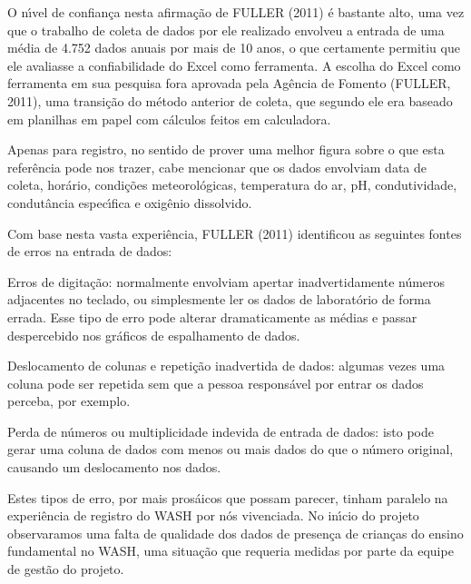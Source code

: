 \documentclass[
12pt,		%
openright,	%
twoside,  %
a4paper,			%
chapter=TITLE,		%
english,			%
french,				%
spanish,			%
brazil				%
]{USPSC-classe/USPSC}
\begin{document}
O n\'{\i}vel de confian\c{c}a nesta afirma\c{c}\~ao de  FULLER (2011) \'e bastante alto, uma vez que o trabalho de coleta de dados por ele realizado envolveu a entrada de uma m\'edia de 4.752 dados anuais por mais de 10 anos, o que certamente permitiu que ele avaliasse a confiabilidade do Excel como ferramenta. A escolha do Excel como ferramenta em sua pesquisa fora aprovada pela Ag\^encia de Fomento  (FULLER, 2011), uma transi\c{c}\~ao do m\'etodo anterior de coleta, que segundo ele era baseado em planilhas em papel com c\'alculos feitos em calculadora.










Apenas para registro, no sentido de prover uma melhor figura sobre o que esta refer\^encia pode nos trazer, cabe mencionar que os dados envolviam data de coleta, hor\'ario, condi\c{c}\~oes meteorol\'ogicas, temperatura do ar, pH, condutividade, condut\^ancia espec\'{\i}fica e oxig\^enio dissolvido.










Com base nesta vasta experi\^encia,  FULLER (2011) identificou as seguintes fontes de erros na entrada de dados:











\begin{alineas}
\item Erros de digita\c{c}\~ao: normalmente envolviam apertar inadvertidamente n\'umeros adjacentes no teclado, ou simplesmente ler os dados de laborat\'orio de forma errada. Esse tipo de erro pode alterar dramaticamente as m\'edias e passar despercebido nos gr\'aficos de espalhamento de dados.
\item Deslocamento de colunas e repeti\c{c}\~ao inadvertida de dados: algumas vezes uma coluna pode ser repetida sem que a pessoa respons\'avel por entrar os dados perceba, por exemplo.
\item Perda de n\'umeros ou multiplicidade indevida de entrada de dados: isto pode gerar uma coluna de dados com menos ou mais dados do que o n\'umero original, causando um deslocamento nos dados.
\end{alineas}

Estes tipos de erro, por mais pros\'aicos que possam parecer, tinham paralelo na experi\^encia de registro do WASH por n\'os vivenciada. No in\'{\i}cio do projeto observaramos uma falta de qualidade dos dados de presen\c{c}a de crian\c{c}as do ensino fundamental no WASH, uma situa\c{c}\~ao que requeria medidas por parte da equipe de gest\~ao do projeto.
\end{document}
